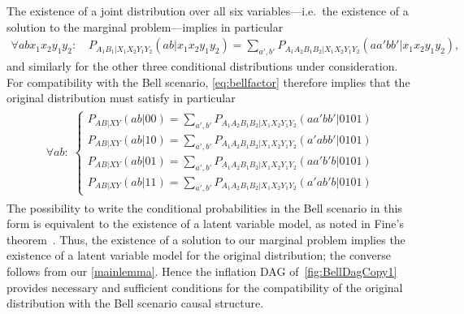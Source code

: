 \documentclass[aps,english,10pt,superscriptaddress,onecolumn,twoside,longbibliography,pra,floatfix,fleqn,nofootinbib]{revtex4-1}%
\theoremstyle{definition}
\begin{document}
The existence of a joint distribution over all six variables---i.e.~the existence of a solution to the marginal problem---implies in particular
\begin{align}
	\forall{a b x_1 x_2 y_1 y_2}: \quad P_{A_1 B_1 | X_1 X_2 Y_1 Y_2}(a b | x_1 x_2 y_1 y_2)  =  \sum\nolimits_{a',b'} P_{A_1 A_2 B_1 B_2 | X_1 X_2 Y_1 Y_2}(a a' b b'|x_1 x_2 y_1 y_2),
\end{align}
and similarly for the other three conditional distributions under consideration. For compatibility with the Bell scenario, \cref{eq:bellfactor} therefore implies that the original distribution must satisfy in particular
\begin{align}\begin{split}\label{eq:finalBellstep}\forall{a b}:\; \begin{cases}
	P_{A B | X Y}(a b | 0 0)  =  \sum\nolimits_{a',b'} P_{A_1 A_2 B_1 B_2| X_1 X_2 Y_1 Y_2}(a a' b b'|0101) \\
	P_{A B | X Y}(a b | 1 0)  =  \sum\nolimits_{a',b'} P_{A_1 A_2 B_1 B_2| X_1 X_2 Y_1 Y_2}(a' a b b'|0101) \\
	P_{A B | X Y}(a b | 0 1)  =  \sum\nolimits_{a',b'} P_{A_1 A_2 B_1 B_2| X_1 X_2 Y_1 Y_2}(a a' b' b|0101) \\
	P_{A B | X Y}(a b | 1 1)  =  \sum\nolimits_{a',b'} P_{A_1 A_2 B_1 B_2| X_1 X_2 Y_1 Y_2}(a' a b' b|0101)
\end{cases}\end{split}\end{align}
The possibility to write the conditional probabilities in the Bell scenario in this form is equivalent to the existence of a latent variable model, as noted in Fine's theorem~\cite{FineTheorem}. Thus, the existence of a solution to our marginal problem implies the existence of a latent variable model for the original distribution; the converse follows from our \cref{mainlemma}. Hence the inflation DAG of~\cref{fig:BellDagCopy1} provides necessary and sufficient conditions for the compatibility of the original distribution with the Bell scenario causal structure.
\end{document}

